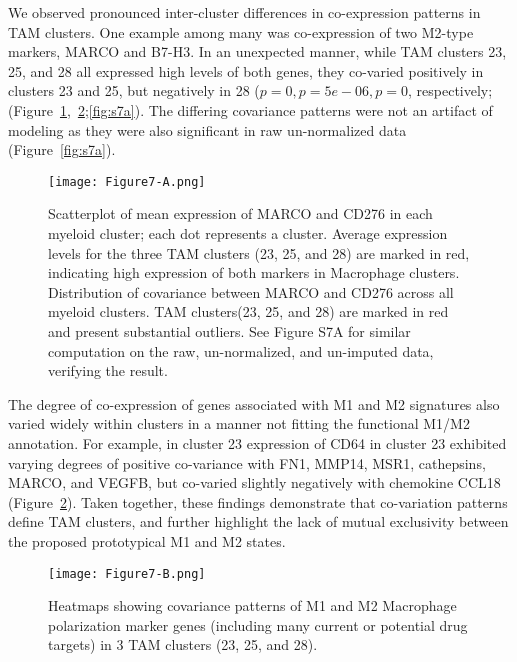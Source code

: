 We observed pronounced inter-cluster differences in co-expression patterns in TAM clusters.
One example among many was co-expression of two M2-type markers, MARCO and B7-H3.
In an unexpected manner, while TAM clusters 23, 25, and 28 all expressed high levels of both genes, they co-varied positively in clusters 23 and 25, but negatively in 28 ($p=0, p=5e-06, p=0$, respectively; (Figure~\ref{fig:7a},~\ref{fig:7b};\ref{fig:s7a}).
The differing covariance patterns were not an artifact of modeling as they were also significant in raw un-normalized data (Figure~\ref{fig:s7a}).

\begin{figure}
\centering
\texttt{[image: Figure7-A.png]}
\caption{Scatterplot of mean expression of MARCO and CD276 in each myeloid cluster; each dot represents a cluster.
  Average expression levels for the three TAM clusters (23, 25, and 28) are marked in red, indicating high expression of both markers in Macrophage clusters.
Distribution of covariance between MARCO and CD276 across all myeloid clusters.
TAM clusters(23, 25, and 28) are marked in red and present substantial outliers.
See Figure S7A for similar computation on the raw, un-normalized, and un-imputed data, verifying the result.
}
\label{fig:7a}
\end{figure}

The degree of co-expression of genes associated with M1 and M2 signatures also varied widely within clusters in a manner not fitting the functional M1/M2 annotation.
For example, in cluster 23 expression of CD64 in cluster 23 exhibited varying degrees of positive co-variance with FN1, MMP14, MSR1, cathepsins, MARCO, and VEGFB, but co-varied slightly negatively with chemokine CCL18 (Figure~\ref{fig:7b}).
Taken together, these findings demonstrate that co-variation patterns define TAM clusters, and further highlight the lack of mutual exclusivity between the proposed prototypical M1 and M2 states.

\begin{figure}
\centering
\texttt{[image: Figure7-B.png]}
\caption{Heatmaps showing covariance patterns of M1 and M2 Macrophage polarization marker genes (including many current or potential drug targets) in 3 TAM clusters (23, 25, and 28).
}
\label{fig:7b}
\end{figure}


